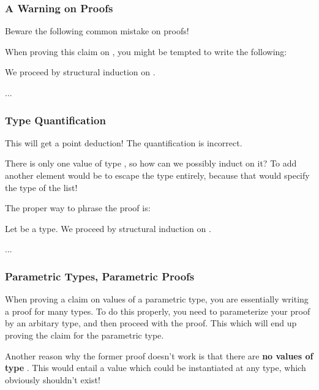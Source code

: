 \documentclass[aspectratio=169]{beamer}
\begin{document}
\begin{frame}[fragile]
  \frametitle{A Warning on Proofs}

  Beware the following common mistake on proofs!


  When proving this claim on , you might be tempted to
  write the following:

  We proceed by structural induction on .


  ...
\end{frame}

\begin{frame}[fragile]
  \frametitle{Type Quantification}

  This will get a point deduction! The quantification is incorrect.

  There is only one value of type , so how can we possibly induct 
  on it? To add another element would be to escape the type entirely, because
  that would specify the type of the list!

  The proper way to phrase the proof is:

  Let  be a type. We proceed by structural induction on .

  ...

\end{frame}

\begin{frame}[fragile]
  \frametitle{Parametric Types, Parametric Proofs}

  When proving a claim on values of a parametric type, you are essentially writing
  a proof for many types. To do this properly, you need to parameterize your proof
  by an arbitary type, and then proceed with the proof. This which will end up 
  proving the claim for the parametric type. 

  Another reason why the former proof doesn't work is that there are 
  \textbf{no values of type }. This would entail a value which could
  be instantiated at any type, which obviously shouldn't exist!
\end{frame}
\end{document}
